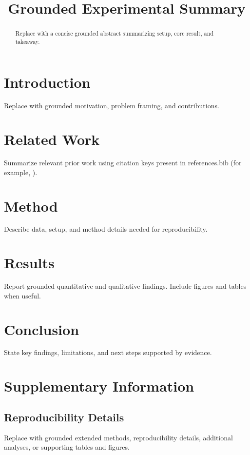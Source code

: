 \documentclass[letterpaper]{article}
\title{Grounded Experimental Summary}
\author{
    
}
\begin{document}
\maketitle

\begin{abstract}
Replace with a concise grounded abstract summarizing setup, core result, and takeaway.
\end{abstract}

\section{Introduction}
Replace with grounded motivation, problem framing, and contributions.

\section{Related Work}
Summarize relevant prior work using citation keys present in references.bib (for example, \citep{templateReference2026}).

\section{Method}
Describe data, setup, and method details needed for reproducibility.

\section{Results}
Report grounded quantitative and qualitative findings. Include figures and tables when useful.

\section{Conclusion}
State key findings, limitations, and next steps supported by evidence.

\clearpage
\footnotesize



\clearpage
\normalsize
\appendix
\section{Supplementary Information}
\subsection{Reproducibility Details}
Replace with grounded extended methods, reproducibility details, additional analyses, or supporting tables and figures.
\end{document}
